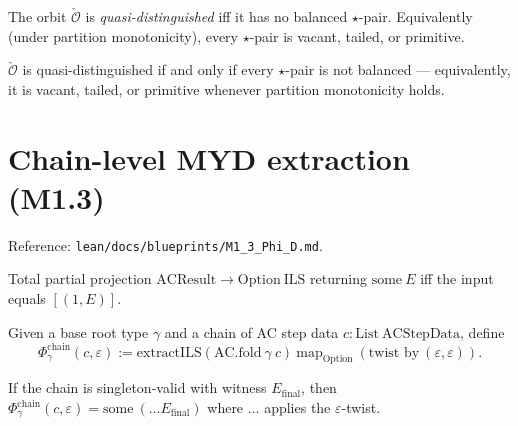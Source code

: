 \begin{definition}
  \label{def:quasi_distinguished}
  \leanok
  The orbit $\check{\mathcal{O}}$ is \emph{quasi-distinguished} iff it has no balanced $\star$-pair. Equivalently (under partition monotonicity), every $\star$-pair is vacant, tailed, or primitive.
\end{definition}

\begin{lemma}
  \label{lem:qd_characterisation}
  \leanok
  $\check{\mathcal{O}}$ is quasi-distinguished if and only if every $\star$-pair is not balanced — equivalently, it is vacant, tailed, or primitive whenever partition monotonicity holds.
\end{lemma}

\section{Chain-level MYD extraction (M1.3)}

Reference: \texttt{lean/docs/blueprints/M1\_3\_Phi\_D.md}.

\begin{definition}
  \label{def:extractILS}
  \leanok
  Total partial projection $\mathrm{ACResult} \to \mathrm{Option\ ILS}$ returning $\mathrm{some}\ E$ iff the input equals $[(1, E)]$.
\end{definition}

\begin{definition}
  \label{def:Phi_chain}
  \leanok
  Given a base root type $\gamma$ and a chain of AC step data $c : \mathrm{List\ ACStepData}$, define
  \[
    \Phi_\gamma^{\mathrm{chain}}(c, \varepsilon) := \mathrm{extractILS}(\mathrm{AC.fold}\ \gamma\ c) \ \mathrm{map}_\mathrm{Option}\ (\text{twist by}\ (\varepsilon, \varepsilon)).
  \]
\end{definition}

\begin{lemma}
  \label{lem:Phi_chain_some_of_chain_singleton}
  \leanok
  If the chain is singleton-valid with witness $E_\text{final}$, then $\Phi_\gamma^{\mathrm{chain}}(c, \varepsilon) = \mathrm{some}\ (\ldots E_\text{final})$ where $\ldots$ applies the $\varepsilon$-twist.
\end{lemma}


